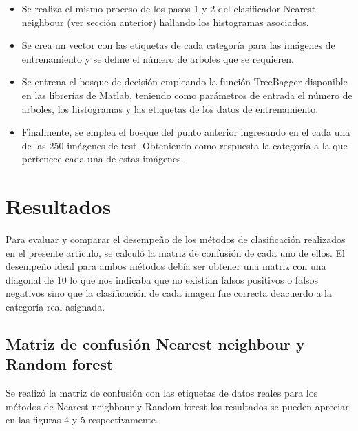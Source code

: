 \documentclass[10pt,twocolumn,letterpaper]{article}
\begin{document}
\begin{itemize}

\item Se realiza el mismo proceso de los pasos 1 y 2 del clasificador Nearest neighbour (ver sección anterior) hallando los histogramas asociados.

\item Se crea un vector con las etiquetas de cada categoría para las imágenes de entrenamiento y se define el número de arboles que se requieren.

\item Se entrena el bosque de decisión empleando la función TreeBagger disponible en las librerías de Matlab, teniendo como parámetros de entrada el número de arboles, los histogramas y las etiquetas de los datos de entrenamiento.

\item Finalmente, se emplea el bosque del punto anterior ingresando en el cada una de las 250 imágenes de test. Obteniendo como respuesta la categoría a la que pertenece cada una de estas imágenes.

\end{itemize}


\section{Resultados}

Para evaluar y comparar el desempeño de los métodos de clasificación realizados en el presente artículo, se calculó la matriz de confusión de cada uno de ellos. El desempeño ideal para ambos métodos debía ser obtener una matriz con una diagonal de 10 lo que nos indicaba que no existían falsos positivos o falsos negativos sino que la clasificación de cada imagen fue correcta deacuerdo a la categoría real asignada.

\subsection{ Matriz de confusión Nearest neighbour y Random forest}

Se realizó la matriz de confusión con las etiquetas de datos reales para los métodos de Nearest neighbour y Random forest los resultados se pueden apreciar en las figuras 4 y 5 respectivamente.
\end{document}

